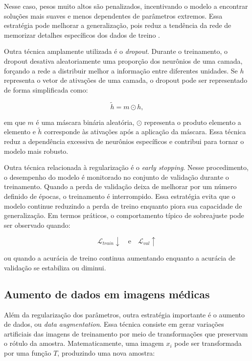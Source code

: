 \documentclass[
    12pt,
    openright,
    oneside,
    a4paper,
    english,
    brazil
]{abntex2}
\begin{document}
Nesse caso, pesos muito altos são penalizados, incentivando o modelo a encontrar soluções mais suaves e menos dependentes de parâmetros extremos. Essa estratégia pode melhorar a generalização, pois reduz a tendência da rede de memorizar detalhes específicos dos dados de treino \cite{goodfellow2016deep}.

Outra técnica amplamente utilizada é o \textit{dropout}. Durante o treinamento, o dropout desativa aleatoriamente uma proporção dos neurônios de uma camada, forçando a rede a distribuir melhor a informação entre diferentes unidades. Se \(h\) representa o vetor de ativações de uma camada, o dropout pode ser representado de forma simplificada como:

\[
\tilde{h} = m \odot h,
\]

em que \(m\) é uma máscara binária aleatória, \(\odot\) representa o produto elemento a elemento e \(\tilde{h}\) corresponde às ativações após a aplicação da máscara. Essa técnica reduz a dependência excessiva de neurônios específicos e contribui para tornar o modelo mais robusto.

Outra técnica relacionada à regularização é o \textit{early stopping}. Nesse procedimento, o desempenho do modelo é monitorado no conjunto de validação durante o treinamento. Quando a perda de validação deixa de melhorar por um número definido de épocas, o treinamento é interrompido. Essa estratégia evita que o modelo continue reduzindo a perda de treino enquanto piora sua capacidade de generalização. Em termos práticos, o comportamento típico de sobreajuste pode ser observado quando:

\[
\mathcal{L}_{train} \downarrow
\quad \text{e} \quad
\mathcal{L}_{val} \uparrow
\]

ou quando a acurácia de treino continua aumentando enquanto a acurácia de validação se estabiliza ou diminui.

\subsection{Aumento de dados em imagens médicas}
\label{subsec:aumento_dados_imagens_medicas}

Além da regularização dos parâmetros, outra estratégia importante é o aumento de dados, ou \textit{data augmentation}. Essa técnica consiste em gerar variações artificiais das imagens de treinamento por meio de transformações que preservam o rótulo da amostra. Matematicamente, uma imagem \(x_i\) pode ser transformada por uma função \(T\), produzindo uma nova amostra:
\end{document}
